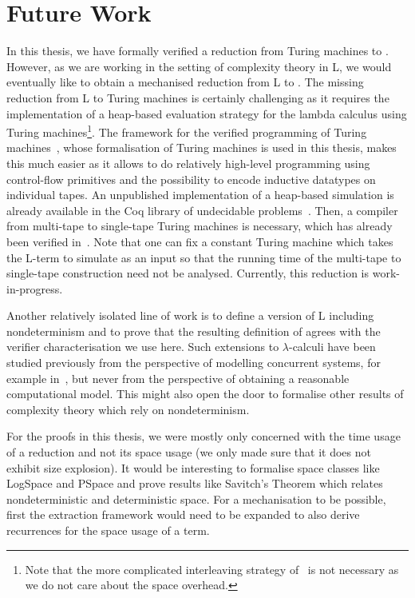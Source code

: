 \section{Future Work}
In this thesis, we have formally verified a reduction from Turing machines to \SAT{}. However, as we are working in the setting of complexity theory in L, we would eventually like to obtain a mechanised reduction from L to \SAT{}.
The missing reduction from L to Turing machines is certainly challenging as it requires the implementation of a heap-based evaluation strategy for the lambda calculus using Turing machines\footnote{Note that the more complicated interleaving strategy of~\cite{ForsterKunzeRoth:2019:wcbv-Reasonable} is not necessary as we do not care about the space overhead.}. The framework for the verified programming of Turing machines~\cite{ForsterEtAl:2019:VerifiedTMs}, whose formalisation of Turing machines is used in this thesis, makes this much easier as it allows to do relatively high-level programming using control-flow primitives and the possibility to encode inductive datatypes on individual tapes. An unpublished implementation of a heap-based simulation is already available in the Coq library of undecidable problems~\cite{coq_undec}. 
Then, a compiler from multi-tape to single-tape Turing machines is necessary, which has already been verified in~\cite{ForsterEtAl:2019:VerifiedTMs}. Note that one can fix a constant Turing machine which takes the L-term to simulate as an input so that the running time of the multi-tape to single-tape construction need not be analysed.
Currently, this reduction is work-in-progress.

Another relatively isolated line of work is to define a version of L including nondeterminism and to prove that the resulting definition of \NP{} agrees with the verifier characterisation we use here. Such extensions to $\lambda$-calculi have been studied previously from the perspective of modelling concurrent systems, for example in~\cite{kutzner:nondet_lambda}, but never from the perspective of obtaining a reasonable computational model. This might also open the door to formalise other results of complexity theory which rely on nondeterminism.

For the proofs in this thesis, we were mostly only concerned with the time usage of a reduction and not its space usage (we only made sure that it does not exhibit size explosion). It would be interesting to formalise space classes like \textsf{LogSpace} and \textsf{PSpace} and prove results like Savitch's Theorem which relates nondeterministic and deterministic space. For a mechanisation to be possible, first the extraction framework would need to be expanded to also derive recurrences for the space usage of a term.

